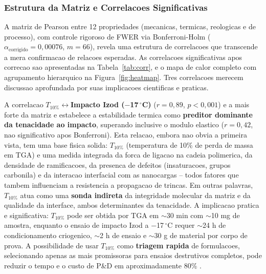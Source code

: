 \documentclass[11pt,a4paper,oneside]{article}
\begin{document}
\subsubsection{Estrutura da Matriz e Correlacoes Significativas}

A matriz de Pearson entre 12 propriedades (mecanicas, termicas, reologicas e de processo), com controle rigoroso de FWER via Bonferroni-Holm ($\alpha_{\text{corrigido}}{=}0{,}00076$, $m{=}66$), revela uma estrutura de correlacoes que transcende a mera confirmacao de relacoes esperadas. As correlacoes significativas apos correcao sao apresentadas na Tabela~\ref{tab:corr}, e o mapa de calor completo com agrupamento hierarquico na Figura~\ref{fig:heatmap}. Tres correlacoes merecem discussao aprofundada por suas implicacoes cientificas e praticas.

A correlacao {\bfseries $T_{10\%}{\leftrightarrow}$Impacto Izod ($-$17$\,^{\circ}$C)} ($r{=}0{,}89$, $p{<}0{,}001$) e a mais forte da matriz e estabelece a estabilidade termica como {\bfseries preditor dominante da tenacidade ao impacto}, superando inclusive o modulo elastico ($r{=}0{,}42$, nao significativo apos Bonferroni). Esta relacao, embora nao obvia a primeira vista, tem uma base fisica solida: $T_{10\%}$ (temperatura de 10\% de perda de massa em TGA) e uma medida integrada da forca de ligacao na cadeia polimerica, da densidade de ramificacoes, da presenca de defeitos (insaturacoes, grupos carbonila) e da interacao interfacial com as nanocargas -- todos fatores que tambem influenciam a resistencia a propagacao de trincas. Em outras palavras, $T_{10\%}$ atua como uma {\bfseries sonda indireta} da integridade molecular da matriz e da qualidade da interface, ambos determinantes da tenacidade. A implicacao pratica e significativa: $T_{10\%}$ pode ser obtida por TGA em ${\sim}$30 min com ${\sim}$10 mg de amostra, enquanto o ensaio de impacto Izod a $-$17$\,^{\circ}$C requer ${\sim}$24 h de condicionamento criogenico, ${\sim}$2 h de ensaio e ${\sim}$30 g de material por corpo de prova. A possibilidade de usar $T_{10\%}$ como {\bfseries triagem rapida} de formulacoes, selecionando apenas as mais promissoras para ensaios destrutivos completos, pode reduzir o tempo e o custo de P\&D em aproximadamente 80\% \cite{Cohen1988}.
\end{document}
